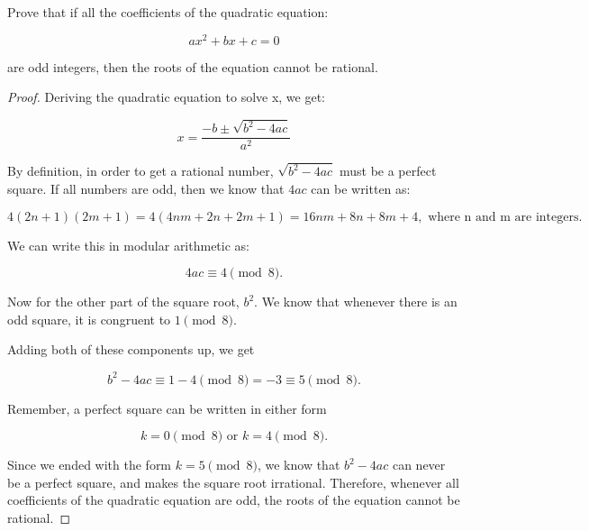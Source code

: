 Prove that if all the coefficients of the quadratic equation:

\[ax^2 + bx + c = 0\]

\noindent
are odd integers, then the roots of the equation cannot be rational.

\begin{proof}

Deriving the quadratic equation to solve x, we get:

\[x = \frac{-b \pm \sqrt{b^2 - 4ac}}{a^2}\]

\noindent
By definition, in order to get a rational number, \(\sqrt{b^2 - 4ac}\) must be a perfect square. If all numbers are odd, then we know that \(4ac\) can be written as:

\[4(2n+1)(2m+1) = 4(4nm+2n+2m+1) = 16nm+8n+8m+4, \text{ where n and m are integers.}\]

\noindent
We can write this in modular arithmetic as:

\[4ac \equiv 4 \pmod8.\]

\noindent
Now for the other part of the square root, \(b^2\). We know that whenever there is an odd square, it is congruent to \(1 \pmod8\).

\noindent
Adding both of these components up, we get

\[b^2 - 4ac \equiv 1 - 4 \pmod8 = -3 \equiv 5 \pmod8.\]

\noindent
Remember, a perfect square can be written in either form

\[k = 0 \pmod8 \text{ or } k = 4\pmod8.\]

\noindent
Since we ended with the form \(k = 5 \pmod8\), we know that \(b^2 - 4ac\) can never be a perfect square, and makes the square root irrational. Therefore, whenever all coefficients of the quadratic equation are odd, the roots of the equation cannot be rational.
\end{proof}
